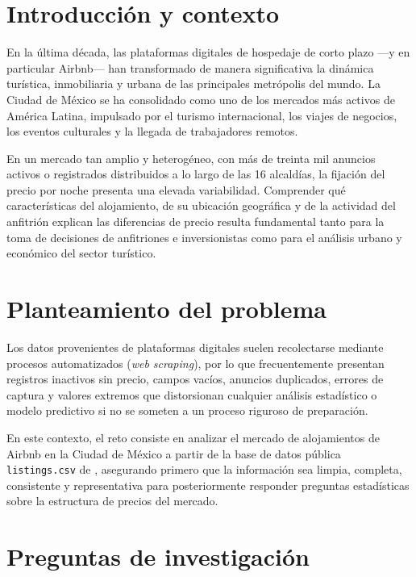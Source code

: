 \documentclass[12pt,letterpaper,oneside]{report}
\begin{document}
\section{Introducción y contexto}

En la última década, las plataformas digitales de hospedaje de corto plazo ---y en particular Airbnb--- han transformado de manera significativa la dinámica turística, inmobiliaria y urbana de las principales metrópolis del mundo. La Ciudad de México se ha consolidado como uno de los mercados más activos de América Latina, impulsado por el turismo internacional, los viajes de negocios, los eventos culturales y la llegada de trabajadores remotos.

En un mercado tan amplio y heterogéneo, con más de treinta mil anuncios activos o registrados distribuidos a lo largo de las 16 alcaldías, la fijación del precio por noche presenta una elevada variabilidad. Comprender qué características del alojamiento, de su ubicación geográfica y de la actividad del anfitrión explican las diferencias de precio resulta fundamental tanto para la toma de decisiones de anfitriones e inversionistas como para el análisis urbano y económico del sector turístico.

\section{Planteamiento del problema}

Los datos provenientes de plataformas digitales suelen recolectarse mediante procesos automatizados (\textit{web scraping}), por lo que frecuentemente presentan registros inactivos sin precio, campos vacíos, anuncios duplicados, errores de captura y valores extremos que distorsionan cualquier análisis estadístico o modelo predictivo si no se someten a un proceso riguroso de preparación.

En este contexto, el reto consiste en analizar el mercado de alojamientos de Airbnb en la Ciudad de México a partir de la base de datos pública \texttt{listings.csv} de \citet{insideairbnb2026}, asegurando primero que la información sea limpia, completa, consistente y representativa para posteriormente responder preguntas estadísticas sobre la estructura de precios del mercado.

\section{Preguntas de investigación}
\end{document}
